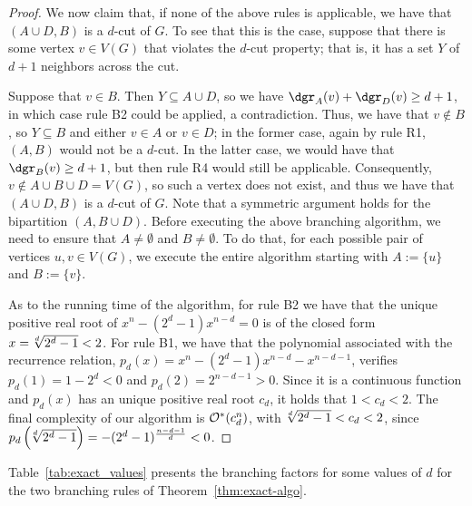 \begin{proof}
    We now claim that, if none of the above rules is applicable, we have that $(A \cup D, B)$ is a $d$-cut of $G$.
    To see that this is the case, suppose that there is some vertex $v \in V(G)$ that violates the $d$-cut property; that is, it has a set $Y$ of $d+1$ neighbors across the cut.

    Suppose that $v \in B$. Then $Y \subseteq A \cup D$, so we have $\dgr_A(v) + \dgr_D(v) \geq d+1$, in which case rule B2 could be applied, a contradiction.
    Thus, we have that $v \notin B$, so $Y \subseteq B$ and either $v \in A$ or $v \in D$;
    in the former case, again by rule R1, $(A, B)$ would not be a $d$-cut.
     In the latter case, we would have that $\dgr_B(v) \geq d+1$, but then rule R4 would still be applicable.
    Consequently, $v \notin A \cup B \cup D = V(G)$, so such a vertex does not exist, and thus we have that $(A \cup D, B)$ is a $d$-cut of $G$.
    Note that a symmetric argument holds for the bipartition $(A, B \cup D)$.
    Before executing the above branching algorithm, we need to ensure that $A \neq \emptyset$ and $B \neq \emptyset$.
    To do that, for each possible pair of vertices $u,v \in V(G)$, we execute the entire algorithm starting with $A := \{u\}$ and $B := \{v\}$.

    As to the running time of the algorithm, for rule B2 we have that the unique positive real root of $x^n - (2^d - 1)x^{n - d} = 0$ is of the closed form $x = \sqrt[\leftroot{2}d]{2^d - 1} < 2$.
    For rule B1, we have that the polynomial associated with the recurrence relation, $p_d(x) = x^n - (2^d - 1)x^{n - d} - x^{n - d - 1}$, verifies $p_d(1) = 1 - 2^d < 0$ and $p_d(2) = 2^{n - d - 1} > 0$.
    Since it is a continuous function and $p_d(x)$ has an unique positive real root $c_d$, it holds that $1 < c_d < 2$.
    The final complexity of our algorithm is $\mathcal{O}^*\!\left(c_d^n\right)$, with $\sqrt[\leftroot{2}d]{2^d - 1} < c_d < 2$, since $p_d\left(\sqrt[\leftroot{2}d]{2^d - 1}\right) = -(2^d - 1)^{\frac{n-d-1}{d}} < 0$.
\end{proof}


Table~\ref{tab:exact_values} presents the branching factors for some values of $d$ for the two branching rules of Theorem~\ref{thm:exact-algo}.

